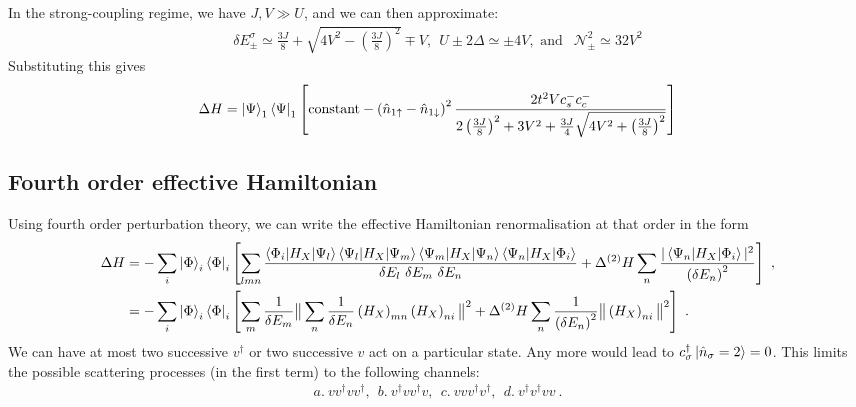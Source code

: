 \documentclass{report}
\numberwithin{equation}{section}
\begin{document}
In the strong-coupling regime, we have \(J,V \gg U\), and we can then approximate:
\begin{equation}\begin{aligned}
	\delta E_{\pm}^\sigma \simeq \frac{3J}{8} + \sqrt{4V^2 - \left(\frac{3J}{8}\right)^2} \mp V, ~~U \pm 2\Delta \simeq \pm 4V, \text{ and }~~ \mathcal{N}_\pm^2 \simeq 32V^2
\end{aligned}\end{equation}
Substituting this gives
\begin{equation}\begin{aligned}
	\Delta H = \ket{\Psi}_1 \bra{\Psi}_1\left[\mathrm{constant} - \left(\hat n_{1 \uparrow} - \hat n_{1 \downarrow}\right)^2 \frac{2t^2V {c_s^-} {c_c^-}}{2\left(\frac{3J}{8}\right)^2 + 3V^2 + \frac{3J}{4}\sqrt{4V^2 + \left(\frac{3J}{8}\right)^2}}\right]\\
\end{aligned}\end{equation}

\subsection{Fourth order effective Hamiltonian}
Using fourth order perturbation theory, we can write the effective Hamiltonian renormalisation at that order in the form
\begin{equation}\begin{aligned}
	\label{eff_ham_4}
	\Delta H &= -\sum_{i}\ket{\Phi}_i\bra{\Phi}_i\left[\sum_{lmn}\frac{\braket{\Phi_i | H_X | \Psi_l}\braket{\Psi_l | H_X | \Psi_m}\braket{\Psi_m | H_X | \Psi_n}\braket{\Psi_n | H_X | \Phi_i}}{\delta E_l ~ \delta E_m ~ \delta E_n} + \Delta^{(2)}H \sum_{n} \frac{|\braket{\Psi_n | H_X | \Phi_i}|^2}{\left(\delta E_n\right)^2}\right]~,\\
		 &= -\sum_{i}\ket{\Phi}_i\bra{\Phi}_i\left[\sum_{m}\frac{1}{\delta E_m}\big\Vert\sum_n \frac{1}{\delta E_n}\left(H_X\right) _{mn}\left(H_X\right)_{ni}\big\Vert^2 + \Delta^{(2)}H \sum_{n} \frac{1}{\left(\delta E_n\right)^2}\big\Vert\left(H_X\right)_{ni}\big\Vert^2\right]~.
\end{aligned}\end{equation}
We can have at most two successive \(v^\dagger\) or two successive \(v\) act on a particular state. Any more would lead to \(c^\dagger_\sigma \ket{\hat n_\sigma =2} = 0\). This limits the possible scattering processes (in the first term) to the following channels:
\begin{equation}\begin{aligned}
	a.~v v^\dagger v v^\dagger,~~b.~v^\dagger v v^\dagger v,~~c.~v v v^\dagger v^\dagger,~~d.~v^\dagger v^\dagger v v~.
\end{aligned}\end{equation}
\end{document}

